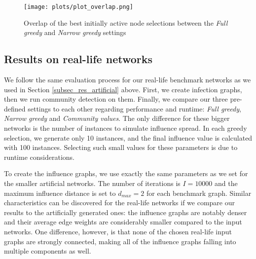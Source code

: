 \documentclass[pdflatex,sn-mathphys-ay]{sn-jnl}
\begin{document}
\begin{figure}[ht]
\centering
\texttt{[image: plots/plot\_overlap.png]}
\caption{Overlap of the best initially active node selections between the \textit{Full greedy} and \textit{Narrow greedy} settings}
\label{fig_overlap}
\end{figure}


\subsection{Results on real-life networks}\label{subsec_res_reallife}

We follow the same evaluation process for our real-life benchmark networks as we used in Section \ref{subsec_res_artificial} above. First, we create infection graphs, then we run community detection on them. Finally, we compare our three pre-defined settings to each other regarding performance and runtime: \textit{Full greedy}, \textit{Narrow greedy} and \textit{Community values}. The only difference for these bigger networks is the number of instances to simulate influence spread. In each greedy selection, we generate only 10 instances, and the final influence value is calculated with 100 instances. Selecting such small values for these parameters is due to runtime considerations.

To create the influence graphs, we use exactly the same parameters as we set for the smaller artificial networks. The number of iterations is $I = 10000$ and the maximum influence distance is set to $d_{max} = 2$ for each benchmark graph. Similar characteristics can be discovered for the real-life networks if we compare our results to the artificially generated ones: the influence graphs are notably denser and their average edge weights are considerably smaller compared to the input networks. One difference, however, is that none of the chosen real-life input graphs are strongly connected, making all of the influence graphs falling into multiple components as well.
\end{document}
